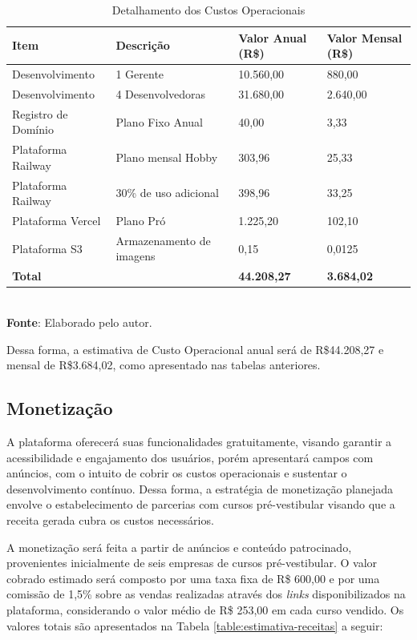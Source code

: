 \begin{table}[h!]
\centering
\caption{Detalhamento dos Custos Operacionais}
\begin{tabular}{|m{4cm}|m{4cm}|m{3cm}|m{3cm}|}
\hline
\textbf{Item} & \textbf{Descrição} & \textbf{Valor Anual (R\$)} & \textbf{Valor Mensal (R\$)} \\
\hline
Desenvolvimento & 1 Gerente  & 10.560,00 & 880,00 \\
\hline
 Desenvolvimento & 4 Desenvolvedoras & 31.680,00 & 2.640,00 \\
\hline
Registro de Domínio & Plano Fixo Anual & 40,00 & 3,33 \\
\hline
Plataforma Railway & Plano mensal Hobby & 303,96 & 25,33 \\
\hline
Plataforma Railway & 30\% de uso adicional & 398,96 & 33,25 \\
\hline
Plataforma Vercel & Plano Pró & 1.225,20 & 102,10 \\
\hline
Plataforma S3 & Armazenamento de imagens & 0,15 & 0,0125   \\
\hline
\textbf{Total} & & \textbf{44.208,27} & \textbf{3.684,02} \\
\hline
\end{tabular}
\label{table:detalhamento-custos}
\\[1ex]
\footnotesize \textbf{Fonte}: Elaborado pelo autor.
\end{table}

Dessa forma, a estimativa de Custo Operacional anual será de R\$44.208,27 e mensal de R\$3.684,02, como apresentado nas tabelas anteriores.


\subsection{Monetização}

A plataforma oferecerá suas funcionalidades gratuitamente, visando garantir a acessibilidade e engajamento dos usuários, porém apresentará campos com anúncios, com o intuito de cobrir os custos operacionais e sustentar o desenvolvimento contínuo. Dessa forma, a estratégia de monetização planejada envolve o estabelecimento de parcerias com cursos pré-vestibular visando que a receita gerada cubra os custos necessários. 

A monetização será feita a partir de anúncios e conteúdo patrocinado, provenientes inicialmente de seis empresas de cursos pré-vestibular. O valor cobrado estimado será composto por uma taxa fixa de R\$ 600,00 e por uma comissão de 1,5\% sobre as vendas realizadas através dos \textit{links} disponibilizados na plataforma, considerando o valor médio de R\$ 253,00 em cada curso vendido. Os valores totais são apresentados na Tabela \ref{table:estimativa-receitas} a seguir: 

